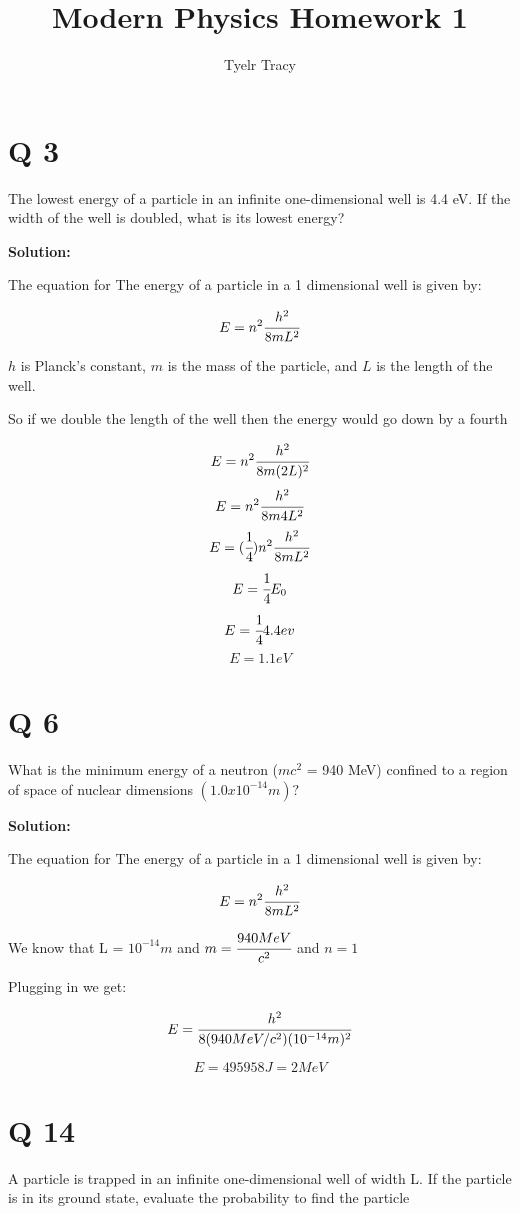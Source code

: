 \documentclass{article}
\title{Modern Physics Homework 1}
\author{Tyelr Tracy}
\begin{document}
\maketitle


\section*{Q 3}

The lowest energy of a particle in an infinite one-dimensional well is 4.4 eV. If the width of the well is doubled, what is its lowest energy?

\textbf{Solution:}

The equation for The energy of a particle in a 1 dimensional well is given by:

$$ E = n^2\cfrac{h^2}{8mL^2} $$

$h$ is Planck's constant, $m$ is the mass of the particle, and $L$ is the length of the well.

So if we double the length of the well then the energy would go down by a fourth

$$ E = n^2\cfrac{h^2}{8m(2L)^2} $$
$$ E = n^2\cfrac{h^2}{8m4L^2} $$
$$ E = (\cfrac{1}{4})n^2\cfrac{h^2}{8mL^2} $$
$$ E = \cfrac{1}{4}E_0 $$
$$ E = \cfrac{1}{4} {4.4ev} $$
$$ E = 1.1 eV $$


\section*{Q 6}

What is the minimum energy of a neutron ($mc^2$ = 940 MeV) confined to a region of space of nuclear dimensions $(1.0 x 10^{-14} m)?$

\textbf{Solution:}

The equation for The energy of a particle in a 1 dimensional well is given by:

$$ E = n^2\cfrac{h^2}{8mL^2} $$

We know that L = $10^{-14} m$ and $m = \cfrac{940 MeV}{c^2}$ and $ n = 1 $

Plugging in we get:

$$ E = \cfrac{h^2}{8(940 MeV/c^2)(10^{-14} m)^2} $$

$$ E = 495958 J = 2 MeV $$


\section*{Q 14}

A particle is trapped in an infinite one-dimensional well of width L. If the particle is in its ground state, evaluate the probability to find the particle
\end{document}
